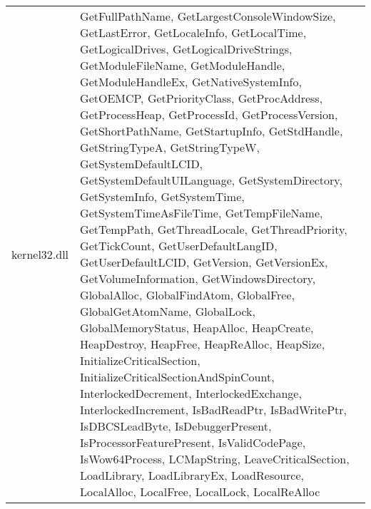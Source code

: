 \begin{longtable}[H]{ | m{3.5cm} | m{10cm} | }
\hline
kernel32.dll & GetFullPathName, GetLargestConsoleWindowSize, GetLastError, GetLocaleInfo, GetLocalTime, GetLogicalDrives, GetLogicalDriveStrings, GetModuleFileName, GetModuleHandle, GetModuleHandleEx, GetNativeSystemInfo, GetOEMCP, GetPriorityClass, GetProcAddress, GetProcessHeap, GetProcessId, GetProcessVersion, GetShortPathName, GetStartupInfo, GetStdHandle, GetStringTypeA, GetStringTypeW, GetSystemDefaultLCID, GetSystemDefaultUILanguage, GetSystemDirectory, GetSystemInfo, GetSystemTime, GetSystemTimeAsFileTime, GetTempFileName, GetTempPath, GetThreadLocale, GetThreadPriority, GetTickCount, GetUserDefaultLangID, GetUserDefaultLCID, GetVersion, GetVersionEx, GetVolumeInformation, GetWindowsDirectory, GlobalAlloc, GlobalFindAtom, GlobalFree, GlobalGetAtomName, GlobalLock, GlobalMemoryStatus, HeapAlloc, HeapCreate, HeapDestroy, HeapFree, HeapReAlloc, HeapSize, InitializeCriticalSection, InitializeCriticalSectionAndSpinCount, InterlockedDecrement, InterlockedExchange, InterlockedIncrement, IsBadReadPtr, IsBadWritePtr, IsDBCSLeadByte, IsDebuggerPresent, IsProcessorFeaturePresent, IsValidCodePage, IsWow64Process, LCMapString, LeaveCriticalSection, LoadLibrary, LoadLibraryEx, LoadResource, LocalAlloc, LocalFree, LocalLock, LocalReAlloc  \\


\end{longtable}
